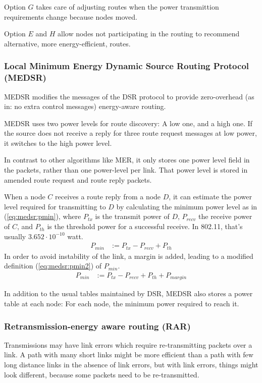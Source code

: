 Option $G$ takes care of adjusting routes when the power transmittion requirements
change because nodes moved.

Option $E$ and $H$ allow nodes not participating in the routing to recommend
alternative, more energy-efficient, routes.
\subsubsection{Local Minimum Energy Dynamic Source Routing Protocol (MEDSR)}
MEDSR\cite{tanque2007minimum} modifies the messages of the DSR protocol to
provide zero-overhead (as in: no extra control messages) energy-aware routing.

MEDSR uses two power levels for route discovery: A low one, and a high one. If
the source does not receive a reply for three route request messages at low
power, it switches to the high power level.

In contrast to other algorithms like MER, it only stores one power level field
in the packets, rather than one power-level per link. That power level is stored
in amended route request and route reply packets.

When a node $C$ receives a route reply from a node $D$, it can estimate the
power level required for transmitting to $D$ by calculating the minimum power
level as in (\ref{eq:medsr:pmin}), where $P_{tx}$ is the transmit power of $D$, $P_{recv}$ the receive power of $C$,
and $P_{th}$ is the threshold power for a successful receive. In 802.11, that's
usually $3.652 \cdot 10^{-10}$ watt.
\begin{align}
  \label{eq:medsr:pmin}
   P_{min} &:= P_{tx} - P_{recv} + P_{th} 
\end{align}
In order to avoid instability of the link, a margin is added,
leading to a modified definition (\ref{eq:medsr:pmin2}) of $P_{min}$.
\begin{align}
  \label{eq:medsr:pmin2}
   P_{min} &:= P_{tx} - P_{recv} + P_{th} + P_{margin}
\end{align}

In addition to the usual tables maintained by DSR, MEDSR also stores a power
table at each node: For each node, the minimum power required to reach it.

\subsubsection{Retransmission-energy aware routing (RAR)}
Transmissions may have link errors which require re-transmitting packets over
a link. A path with many short links might be more efficient than a path with
few long distance links in the absence of link errors, but with link errors,
things might look different, because some packets need to be re-transmitted.

